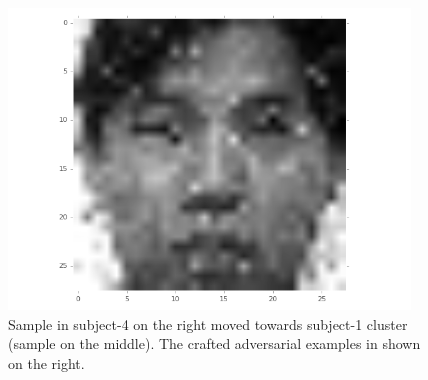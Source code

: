\documentclass{beamer}
\begin{document}
\begin{frame}
\begin{figure}[H]
\begin{minipage}[t]{0.30\linewidth}
			\includegraphics[width=0.95\textwidth]{img/target/advsubject0.png}
		\end{minipage}
		\caption{\footnotesize Sample in subject-4 on the right moved towards subject-1 cluster (sample on the middle). The crafted adversarial examples in shown on the right.}
	\end{figure}
	
\end{frame}
\end{document}
